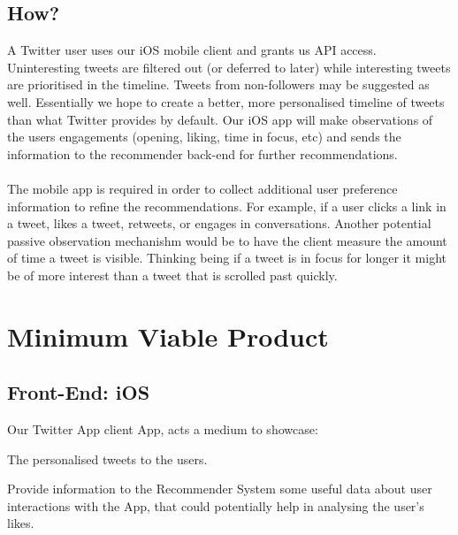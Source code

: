 \documentclass{article}
\begin{document}
\subsection{How?}
A Twitter user uses our iOS mobile client and grants us API access. Uninteresting tweets are filtered out (or deferred to later) while interesting tweets are prioritised in the timeline. Tweets from non-followers may be suggested as well. Essentially we hope to create a better, more personalised timeline of tweets than what Twitter provides by default. Our iOS app will make observations of the users engagements (opening, liking, time in focus, etc) and sends the information to the recommender back-end for further recommendations.
\\\\
The mobile app is required in order to collect additional user preference information to refine the recommendations. For example, if a user clicks a link in a tweet, likes a tweet, retweets, or engages in conversations. Another potential passive observation mechanishm would be to have the client measure the amount of time a tweet is visible. Thinking being if a tweet is in focus for longer it might be of more interest than a tweet that is scrolled past quickly.


\section{Minimum Viable Product}
% 

\subsection{Front-End: iOS}
Our Twitter App client App, acts a medium to showcase:

\begin{itemize*}
	\item The personalised tweets to the users.
	\item Provide information to the Recommender System some useful data about user interactions with the App, that could potentially help in analysing the user's likes.
\end{itemize*}
\end{document}
